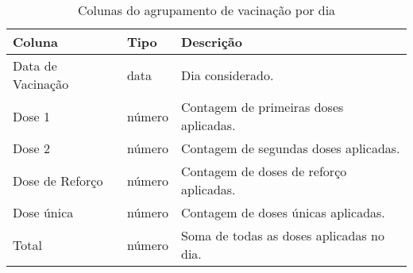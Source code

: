 \begin{table}[H] 
  \centering

  \begin{tabular}{lll}
  \hline
    \multicolumn{1}{|l|}{\textbf{Coluna}} & \multicolumn{1}{l|}{\textbf{Tipo}} & \multicolumn{1}{l|}{\textbf{Descrição}}  \\ \hline
    Data de Vacinação                     & data                          & Dia considerado.                         \\
    Dose 1                                & número                                & Contagem de primeiras doses aplicadas.   \\
    Dose 2                                & número                                & Contagem de segundas doses aplicadas.    \\
    Dose de Reforço                       & número                                & Contagem de doses de reforço aplicadas.  \\
    Dose única                            & número                                & Contagem de doses únicas aplicadas.      \\
    Total                                 & número                                & Soma de todas as doses aplicadas no dia.
  \end{tabular}
  \caption{Colunas do agrupamento de vacinação por dia}
  \label{tbl:tabela-vacinometro} 
\end{table}